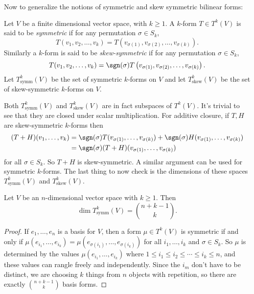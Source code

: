 \documentclass[11pt,letterpaper]{article}
\begin{document}
Now to generalize the notions of symmetric and skew symmetric bilinear forms:

\begin{definition}\label{symm}
  Let $V$ be a finite dimensional vector space, with $k\geq 1$. A $k$-form $T\in T^k(V)$ is said to be {\em symmetric} if for any permutation $\sigma\in S_k$,
  \[
    T(v_1,v_2,\ldots, v_k) = T\left(v_{\sigma(1)}, v_{\sigma(2)}, \ldots, v_{\sigma(k)}\right)
  .\] 
 Similarly a $k$-form is said to be {\em skew-symmetric} if for any permutation $\sigma\in S_k$,
  \[
    T(v_1,v_2,\ldots, v_k) = \sgn(\sigma)T\left(v_{\sigma(1)}, v_{\sigma(2)}, \ldots, v_{\sigma(k)}\right)
  .\] 
  Let $T^k_{\mathrm{symm}}(V)$ be the set of symmetric $k$-forms on $V$ and let $T^k_{\mathrm{skew}}(V)$ be the set of skew-symmetric $k$-forms on $V$. 
\end{definition}

Both $T^k_{\mathrm{symm}}(V)$ and $T^k_{\mathrm{skew}}(V)$ are in fact subspaces of $T^k(V)$. It's trivial to see that they are closed under scalar multiplication. For additive closure, if $T, H$ are skew-symmetric $k$-forms then
\[
  \begin{aligned}
  (T+H)(v_1,\ldots, v_k) &= \sgn(\sigma)T(v_{\sigma(1)},\ldots, v_{\sigma(k)})+\sgn(\sigma)H(v_{\sigma(1)},\ldots,v_{\sigma(k)})\\
  &= \sgn(\sigma)(T+H)(v_{\sigma(1)},\ldots, v_{\sigma(k)})
  \end{aligned}
\]
for all $\sigma\in S_k$. So $T+H$ is skew-symmetric. A similar argument can be used for symmetric $k$-forms. The last thing to now check is the dimensions of these spaces $T^k_{\mathrm{symm}}(V)$ and $T^k_{\mathrm{skew}}(V)$.

\begin{proposition}\label{dimsymm}
  Let $V$ be an $n$-dimensional vector space with $k\geq 1$. Then
  \[
    \dim T^k_{\mathrm{symm}}(V) = \binom{n+k-1}{k}
  .\]   
\end{proposition}
\begin{proof}
  If $e_1,\ldots,e_n$ is a basis for $V$, then a form $\mu\in T^k(V)$ is symmetric if and only if $\mu(e_{i_1},\ldots, e_{i_k})=\mu(e_{\sigma(i_1)},\ldots, e_{\sigma(i_k)})$ for all $i_1,\ldots, i_k$ and $\sigma\in S_k$. So $\mu$ is determined by the values $\mu(e_{i_1},\ldots, e_{i_k})$ where $1\leq i_1\leq i_2\leq\cdots\leq i_k\leq n$, and these values can rangle freely and independently. Since the $i_m$ don't have to be distinct, we are choosing $k$ things from $n$ objects with repetition, so there are exactly $\binom{n+k-1}{k}$ basis forms. 
\end{proof}
\end{document}
